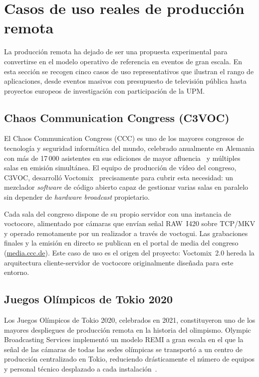 \section{Casos de uso reales de producción remota}
\label{sec:casos_uso_remi}

La producción remota ha dejado de ser una propuesta experimental para convertirse en el
modelo operativo de referencia en eventos de gran escala. En esta sección se recogen
cinco casos de uso representativos que ilustran el rango de aplicaciones, desde eventos
masivos con presupuesto de televisión pública hasta proyectos europeos de investigación
con participación de la UPM.

\subsection{Chaos Communication Congress (C3VOC)}

El Chaos Communication Congress (CCC) es uno de los mayores congresos de tecnología y
seguridad informática del mundo, celebrado anualmente en Alemania con más de 17\,000 asistentes en sus ediciones de
mayor afluencia~\cite{ccc_36c3_2019} y múltiples salas en emisión simultánea. El equipo de producción de vídeo del
congreso, C3VOC, desarrolló Voctomix~\cite{voctomix_github} precisamente para cubrir
esta necesidad: un mezclador \textit{software} de código abierto capaz de gestionar varias salas
en paralelo sin depender de \textit{hardware broadcast} propietario.

Cada sala del congreso dispone de su propio servidor con una instancia de voctocore,
alimentado por cámaras que envían señal RAW~I420 sobre TCP/MKV y operado remotamente
por un realizador a través de voctogui. Las grabaciones finales y la emisión en directo
se publican en el portal de media del congreso (\url{media.ccc.de}). Este caso de
uso es el origen del proyecto: Voctomix~2.0 hereda la
arquitectura cliente-servidor de voctocore originalmente diseñada para este entorno.

\subsection{Juegos Olímpicos de Tokio 2020}

Los Juegos Olímpicos de Tokio 2020, celebrados en 2021, constituyeron uno de los mayores
despliegues de producción remota en la historia del olimpismo. Olympic Broadcasting
Services implementó un modelo REMI a gran escala en el que la señal de las
cámaras de todas las sedes olímpicas se transportó a un centro de producción centralizado
en Tokio, reduciendo drásticamente el número de equipos y personal técnico desplazado
a cada instalación~\cite{obs_tokyo_2021}.

